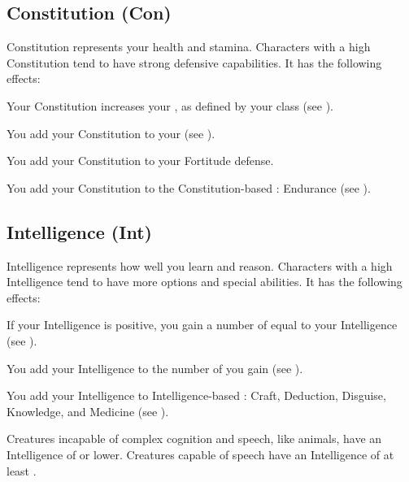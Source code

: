   \subsection{Constitution (Con)}\label{Constitution}
    {
      Constitution represents your health and stamina.
      Characters with a high Constitution tend to have strong defensive capabilities.
      It has the following effects:
      \begin{raggeditemize}
        \item Your Constitution increases your , as defined by your class (see ).
        \item You add your Constitution to your  (see ).
        \item You add your Constitution to your Fortitude defense.
        \item You add your Constitution to the Constitution-based : Endurance (see ).
      \end{raggeditemize}
    }

  \subsection{Intelligence (Int)}\label{Intelligence}
    {
      Intelligence represents how well you learn and reason.
      Characters with a high Intelligence tend to have more options and special abilities.
      It has the following effects:

      \begin{raggeditemize}
        \item If your Intelligence is positive, you gain a number of  equal to your Intelligence (see ).
        \item You add your Intelligence to the number of  you gain (see ).
        \item You add your Intelligence to Intelligence-based : Craft, Deduction, Disguise, Knowledge, and Medicine (see ).
      \end{raggeditemize}

      \par Creatures incapable of complex cognition and speech, like animals, have an Intelligence of  or lower.
      Creatures capable of speech have an Intelligence of at least .
    }

